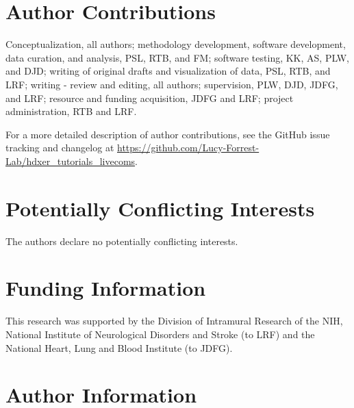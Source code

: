 \documentclass[9pt,tutorial,ASAPversion]{livecoms}
\newcommand{\githubrepository}{\url{https://github.com/Lucy-Forrest-Lab/hdxer_tutorials_livecoms}}
\begin{document}
\section{Author Contributions}

Conceptualization, all authors; methodology development, software development, data curation, and analysis, PSL, RTB, and FM; software testing, KK, AS, PLW, and DJD; writing of original drafts and visualization of data, PSL, RTB, and LRF; writing - review and editing, all authors; supervision, PLW, DJD, JDFG, and LRF; resource and funding acquisition, JDFG and LRF; project administration, RTB and LRF.

For a more detailed description of author contributions,
see the GitHub issue tracking and changelog at \githubrepository.

\section{Potentially Conflicting Interests}

The authors declare no potentially conflicting interests.

\section{Funding Information}
This research was supported by the Division of Intramural Research of the NIH, National Institute of Neurological Disorders and Stroke (to LRF) and the National Heart, Lung and Blood Institute (to JDFG).

\section*{Author Information}
\makeorcid




\end{document}
